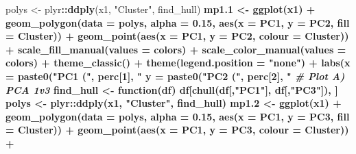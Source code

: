 \documentclass[
]{article}
\newenvironment{Shaded}{\begin{snugshade}}{\end{snugshade}}
\newcommand{\CommentTok}[1]{\textcolor[rgb]{0.56,0.35,0.01}{\textit{#1}}}
\newcommand{\ControlFlowTok}[1]{\textcolor[rgb]{0.13,0.29,0.53}{\textbf{#1}}}
\newcommand{\DataTypeTok}[1]{\textcolor[rgb]{0.13,0.29,0.53}{#1}}
\newcommand{\DecValTok}[1]{\textcolor[rgb]{0.00,0.00,0.81}{#1}}
\newcommand{\FloatTok}[1]{\textcolor[rgb]{0.00,0.00,0.81}{#1}}
\newcommand{\KeywordTok}[1]{\textcolor[rgb]{0.13,0.29,0.53}{\textbf{#1}}}
\newcommand{\NormalTok}[1]{#1}
\newcommand{\OperatorTok}[1]{\textcolor[rgb]{0.81,0.36,0.00}{\textbf{#1}}}
\newcommand{\StringTok}[1]{\textcolor[rgb]{0.31,0.60,0.02}{#1}}
\begin{document}
\begin{Shaded}
\begin{Highlighting}[]
{{{{{{{{{{{{{\NormalTok{polys <-}\StringTok{ }\NormalTok{plyr}\OperatorTok{::}\KeywordTok{ddply}\NormalTok{(x1, }\StringTok{"Cluster"}\NormalTok{, find_hull) }\OperatorTok{%
\NormalTok{mp1}\FloatTok{.1}\NormalTok{ <-}\StringTok{ }\KeywordTok{ggplot}\NormalTok{(x1) }\OperatorTok{+}
\StringTok{  }\KeywordTok{geom_polygon}\NormalTok{(}\DataTypeTok{data =}\NormalTok{ polys, }\DataTypeTok{alpha =} \FloatTok{0.15}\NormalTok{, }\KeywordTok{aes}\NormalTok{(}\DataTypeTok{x =}\NormalTok{ PC1, }\DataTypeTok{y =}\NormalTok{ PC2, }\DataTypeTok{fill =}\NormalTok{ Cluster)) }\OperatorTok{+}
\StringTok{  }\KeywordTok{geom_point}\NormalTok{(}\KeywordTok{aes}\NormalTok{(}\DataTypeTok{x =}\NormalTok{ PC1, }\DataTypeTok{y =}\NormalTok{ PC2, }\DataTypeTok{colour =}\NormalTok{ Cluster)) }\OperatorTok{+}
\StringTok{  }\KeywordTok{scale_fill_manual}\NormalTok{(}\DataTypeTok{values =}\NormalTok{ colors) }\OperatorTok{+}
\StringTok{  }\KeywordTok{scale_color_manual}\NormalTok{(}\DataTypeTok{values =}\NormalTok{ colors) }\OperatorTok{+}
\StringTok{  }\KeywordTok{theme_classic}\NormalTok{() }\OperatorTok{+}\StringTok{ }
\StringTok{  }\KeywordTok{theme}\NormalTok{(}\DataTypeTok{legend.position =} \StringTok{"none"}\NormalTok{) }\OperatorTok{+}
\StringTok{  }\KeywordTok{labs}\NormalTok{(}\DataTypeTok{x =} \KeywordTok{paste0}\NormalTok{(}\StringTok{"PC1 ("}\NormalTok{, perc[}\DecValTok{1}\NormalTok{], }\StringTok{"%
       \DataTypeTok{y =} \KeywordTok{paste0}\NormalTok{(}\StringTok{"PC2 ("}\NormalTok{, perc[}\DecValTok{2}\NormalTok{], }\StringTok{"%
\CommentTok{# Plot A) PCA 1v3}
\NormalTok{find_hull <-}\StringTok{ }\ControlFlowTok{function}\NormalTok{(df) df[}\KeywordTok{chull}\NormalTok{(df[,}\StringTok{"PC1"}\NormalTok{], df[,}\StringTok{"PC3"}\NormalTok{]), ]}
\NormalTok{polys <-}\StringTok{ }\NormalTok{plyr}\OperatorTok{::}\KeywordTok{ddply}\NormalTok{(x1, }\StringTok{"Cluster"}\NormalTok{, find_hull) }\OperatorTok{%
\NormalTok{mp1}\FloatTok{.2}\NormalTok{ <-}\StringTok{ }\KeywordTok{ggplot}\NormalTok{(x1) }\OperatorTok{+}
\StringTok{  }\KeywordTok{geom_polygon}\NormalTok{(}\DataTypeTok{data =}\NormalTok{ polys, }\DataTypeTok{alpha =} \FloatTok{0.15}\NormalTok{, }\KeywordTok{aes}\NormalTok{(}\DataTypeTok{x =}\NormalTok{ PC1, }\DataTypeTok{y =}\NormalTok{ PC3, }\DataTypeTok{fill =}\NormalTok{ Cluster)) }\OperatorTok{+}
\StringTok{  }\KeywordTok{geom_point}\NormalTok{(}\KeywordTok{aes}\NormalTok{(}\DataTypeTok{x =}\NormalTok{ PC1, }\DataTypeTok{y =}\NormalTok{ PC3, }\DataTypeTok{colour =}\NormalTok{ Cluster)) }\OperatorTok{+}
}}}}}}}}}}}}}}}}}
\end{Highlighting}
\end{Shaded}
\end{document}
